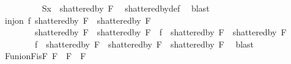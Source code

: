 \begin{isabellebody}
\isanewline
\ \ \ \ \ \ \ \ \isamarkupfalse%
\ {\isachardoublequoteopen}S{\isacharunderscore}{\kern0pt}x\ {\isasymin}\ shattered{\isacharunderscore}{\kern0pt}by\ F{\isachardoublequoteclose}\ \isamarkupfalse%
\ shattered{\isacharunderscore}{\kern0pt}by{\isacharunderscore}{\kern0pt}def\ \isamarkupfalse%
\ blast\isanewline
\ \ \ \ \ \ \isamarkupfalse%
\isanewline
\isanewline
\ \ \ \ \ \ \isamarkupfalse%
\ {}\ {}\ {}\ \isamarkupfalse%
\ {\isachardoublequoteopen}inj{\isacharunderscore}{\kern0pt}on\ {\isacharquery}{\kern0pt}f\ {\isacharparenleft}{\kern0pt}shattered{\isacharunderscore}{\kern0pt}by\ {\isacharquery}{\kern0pt}F{}\ {\isasyminter}\ shattered{\isacharunderscore}{\kern0pt}by\ {\isacharquery}{\kern0pt}F{}{\isacharparenright}{\kern0pt}\ {\isasymand}\isanewline
\ \ \ \ \ \ \ \ {\isacharparenleft}{\kern0pt}shattered{\isacharunderscore}{\kern0pt}by\ {\isacharquery}{\kern0pt}F{}\ {\isasymunion}\ shattered{\isacharunderscore}{\kern0pt}by\ {\isacharquery}{\kern0pt}F{}{\isacharparenright}{\kern0pt}\ {\isasyminter}\ {\isacharparenleft}{\kern0pt}{\isacharquery}{\kern0pt}f\ {\isacharbackquote}{\kern0pt}\ {\isacharparenleft}{\kern0pt}shattered{\isacharunderscore}{\kern0pt}by\ {\isacharquery}{\kern0pt}F{}\ {\isasyminter}\ shattered{\isacharunderscore}{\kern0pt}by\ {\isacharquery}{\kern0pt}F{}{\isacharparenright}{\kern0pt}{\isacharparenright}{\kern0pt}\ {\isacharequal}{\kern0pt}\ {\isacharbraceleft}{\kern0pt}{\isacharbraceright}{\kern0pt}\ {\isasymand}\isanewline
\ \ \ \ \ \ \ \ {\isacharquery}{\kern0pt}f\ {\isacharbackquote}{\kern0pt}\ {\isacharparenleft}{\kern0pt}shattered{\isacharunderscore}{\kern0pt}by\ {\isacharquery}{\kern0pt}F{}\ {\isasyminter}\ shattered{\isacharunderscore}{\kern0pt}by\ {\isacharquery}{\kern0pt}F{}{\isacharparenright}{\kern0pt}\ {\isasymsubseteq}\ shattered{\isacharunderscore}{\kern0pt}by\ F{\isachardoublequoteclose}\ \isamarkupfalse%
\ blast\isanewline
\ \ \ \ \isamarkupfalse%
\isanewline
\isanewline
\ \ \ \ \isamarkupfalse%
\ F{}{\isacharunderscore}{\kern0pt}union{\isacharunderscore}{\kern0pt}F{}{\isacharunderscore}{\kern0pt}is{\isacharunderscore}{\kern0pt}F{\isacharcolon}{\kern0pt}\ {\isachardoublequoteopen}{\isacharquery}{\kern0pt}F{}\ {\isasymunion}\ {\isacharquery}{\kern0pt}F{}\ {\isacharequal}{\kern0pt}\ F{\isachardoublequoteclose}\ \isamarkupfalse%

\end{isabellebody}
